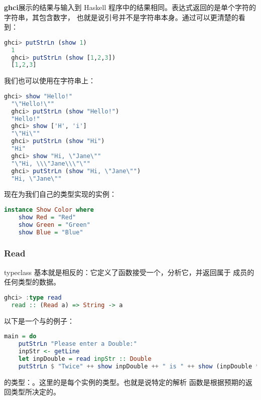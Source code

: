 \documentclass[./main.tex]{subfiles}
\begin{document}
\textbf{ghci}展示的结果与输入到 Haskell 程序中的结果相同。表达式返回的是单个字符的字符串，其包含数字，
也就是说引号并不是字符串本身。通过可以更清楚的看到：

\begin{lstlisting}[language=Haskell]
  ghci> putStrLn (show 1)
  1
  ghci> putStrLn (show [1,2,3])
  [1,2,3]
\end{lstlisting}

我们也可以使用在字符串上：

\begin{lstlisting}[language=Haskell]
  ghci> show "Hello!"
  "\"Hello!\""
  ghci> putStrLn (show "Hello!")
  "Hello!"
  ghci> show ['H', 'i']
  "\"Hi\""
  ghci> putStrLn (show "Hi")
  "Hi"
  ghci> show "Hi, \"Jane\""
  "\"Hi, \\\"Jane\\\"\""
  ghci> putStrLn (show "Hi, \"Jane\"")
  "Hi, \"Jane\""
\end{lstlisting}

现在为我们自己的类型实现的实例：

\begin{lstlisting}[language=Haskell]
  instance Show Color where
    show Red = "Red"
    show Green = "Green"
    show Blue = "Blue"
\end{lstlisting}

\subsubsection*{Read}

 typeclass 基本就是相反的：它定义了函数接受一个，分析它，并返回属于
成员的任何类型的数据。

\begin{lstlisting}[language=Haskell]
  ghci> :type read
  read :: (Read a) => String -> a
\end{lstlisting}

以下是一个与的例子：

\begin{lstlisting}[language=Haskell]
  main = do
    putStrLn "Please enter a Double:"
    inpStr <- getLine
    let inpDouble = read inpStr :: Double
    putStrLn $ "Twice" ++ show inpDouble ++ " is " ++ show (inpDouble * 2)
\end{lstlisting}

的类型：。这里的是每个实例的类型。也就是说特定的解析
函数是根据预期的返回类型所决定的。
\end{document}
